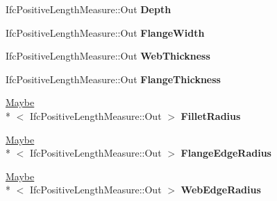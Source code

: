 \begin{DoxyCompactItemize}
\item 
\hypertarget{struct_assimp_1_1_i_f_c_1_1_ifc_t_shape_profile_def_aace44f1a9c736b43b7345fa42f3556e8}{Ifc\+Positive\+Length\+Measure\+::\+Out {\bfseries Depth}}\label{struct_assimp_1_1_i_f_c_1_1_ifc_t_shape_profile_def_aace44f1a9c736b43b7345fa42f3556e8}

\item 
\hypertarget{struct_assimp_1_1_i_f_c_1_1_ifc_t_shape_profile_def_a24007317d42c29740842ed4c3e23b6c6}{Ifc\+Positive\+Length\+Measure\+::\+Out {\bfseries Flange\+Width}}\label{struct_assimp_1_1_i_f_c_1_1_ifc_t_shape_profile_def_a24007317d42c29740842ed4c3e23b6c6}

\item 
\hypertarget{struct_assimp_1_1_i_f_c_1_1_ifc_t_shape_profile_def_ae8deb5309734b3b31618b29f286487fe}{Ifc\+Positive\+Length\+Measure\+::\+Out {\bfseries Web\+Thickness}}\label{struct_assimp_1_1_i_f_c_1_1_ifc_t_shape_profile_def_ae8deb5309734b3b31618b29f286487fe}

\item 
\hypertarget{struct_assimp_1_1_i_f_c_1_1_ifc_t_shape_profile_def_a3189449d625d175c12750799ffe4e752}{Ifc\+Positive\+Length\+Measure\+::\+Out {\bfseries Flange\+Thickness}}\label{struct_assimp_1_1_i_f_c_1_1_ifc_t_shape_profile_def_a3189449d625d175c12750799ffe4e752}

\item 
\hypertarget{struct_assimp_1_1_i_f_c_1_1_ifc_t_shape_profile_def_ad31c4304c56c61c7a9de173540ece7c9}{\hyperlink{struct_assimp_1_1_s_t_e_p_1_1_maybe}{Maybe}\\*
$<$ Ifc\+Positive\+Length\+Measure\+::\+Out $>$ {\bfseries Fillet\+Radius}}\label{struct_assimp_1_1_i_f_c_1_1_ifc_t_shape_profile_def_ad31c4304c56c61c7a9de173540ece7c9}

\item 
\hypertarget{struct_assimp_1_1_i_f_c_1_1_ifc_t_shape_profile_def_a80a233d5fc9ba10680be90f73c7e659c}{\hyperlink{struct_assimp_1_1_s_t_e_p_1_1_maybe}{Maybe}\\*
$<$ Ifc\+Positive\+Length\+Measure\+::\+Out $>$ {\bfseries Flange\+Edge\+Radius}}\label{struct_assimp_1_1_i_f_c_1_1_ifc_t_shape_profile_def_a80a233d5fc9ba10680be90f73c7e659c}

\item 
\hypertarget{struct_assimp_1_1_i_f_c_1_1_ifc_t_shape_profile_def_a2bc6e6fd9cf9844bb41d4c069fa78ee2}{\hyperlink{struct_assimp_1_1_s_t_e_p_1_1_maybe}{Maybe}\\*
$<$ Ifc\+Positive\+Length\+Measure\+::\+Out $>$ {\bfseries Web\+Edge\+Radius}}\label{struct_assimp_1_1_i_f_c_1_1_ifc_t_shape_profile_def_a2bc6e6fd9cf9844bb41d4c069fa78ee2}


\end{DoxyCompactItemize}

